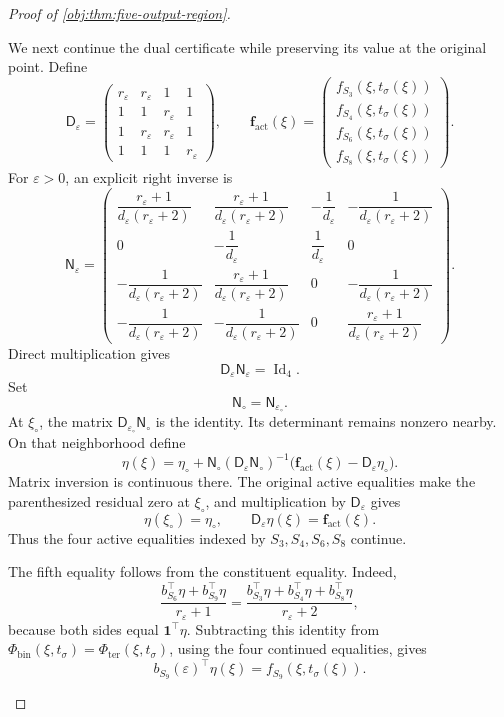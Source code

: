 \begin{proof}[Proof of \cref{obj:thm:five-output-region}]
\begin{enumerate}
We next continue the dual certificate while preserving its value at the
original point. Define
\[
\mathsf D_\varepsilon=
\begin{pmatrix}
r_\varepsilon&r_\varepsilon&1&1\\
1&1&r_\varepsilon&1\\
1&r_\varepsilon&r_\varepsilon&1\\
1&1&1&r_\varepsilon
\end{pmatrix},
\qquad
\boldsymbol f_{\mathrm{act}}(\xi)=
\begin{pmatrix}
f_{S_3}(\xi,t_\sigma(\xi))\\
f_{S_4}(\xi,t_\sigma(\xi))\\
f_{S_6}(\xi,t_\sigma(\xi))\\
f_{S_8}(\xi,t_\sigma(\xi))
\end{pmatrix}.
\]
For \(\varepsilon>0\), an explicit right inverse is
\[
\mathsf N_\varepsilon=
\begin{pmatrix}
\dfrac{r_\varepsilon+1}{d_\varepsilon(r_\varepsilon+2)}
&\dfrac{r_\varepsilon+1}{d_\varepsilon(r_\varepsilon+2)}
&-\dfrac1{d_\varepsilon}
&-\dfrac1{d_\varepsilon(r_\varepsilon+2)}\\
0&-\dfrac1{d_\varepsilon}&\dfrac1{d_\varepsilon}&0\\
-\dfrac1{d_\varepsilon(r_\varepsilon+2)}
&\dfrac{r_\varepsilon+1}{d_\varepsilon(r_\varepsilon+2)}
&0&-\dfrac1{d_\varepsilon(r_\varepsilon+2)}\\
-\dfrac1{d_\varepsilon(r_\varepsilon+2)}
&-\dfrac1{d_\varepsilon(r_\varepsilon+2)}
&0&\dfrac{r_\varepsilon+1}{d_\varepsilon(r_\varepsilon+2)}
\end{pmatrix}.
\]
Direct multiplication gives
\[
\mathsf D_\varepsilon\mathsf N_\varepsilon=\operatorname{Id}_4.
\]
Set
\[
\mathsf N_\circ=\mathsf N_{\varepsilon_\circ}.
\]
At \(\xi_\circ\), the matrix
\(\mathsf D_{\varepsilon_\circ}\mathsf N_\circ\) is the identity.
Its determinant remains nonzero nearby. On that neighborhood define
\[
\eta(\xi)
=
\eta_\circ+
\mathsf N_\circ
(\mathsf D_\varepsilon\mathsf N_\circ)^{-1}
\bigl(\boldsymbol f_{\mathrm{act}}(\xi)
      -\mathsf D_\varepsilon\eta_\circ\bigr).
\]
Matrix inversion is continuous there. The original active equalities
make the parenthesized residual zero at \(\xi_\circ\), and multiplication
by \(\mathsf D_\varepsilon\) gives
\[
\eta(\xi_\circ)=\eta_\circ,
\qquad
\mathsf D_\varepsilon\eta(\xi)=\boldsymbol f_{\mathrm{act}}(\xi).
\]
Thus the four active equalities indexed by \(S_3,S_4,S_6,S_8\) continue.

The fifth equality follows from the constituent equality. Indeed,
\[
\frac{b_{S_6}^\top\eta+b_{S_9}^\top\eta}{r_\varepsilon+1}
=
\frac{b_{S_3}^\top\eta+b_{S_4}^\top\eta+b_{S_8}^\top\eta}
     {r_\varepsilon+2},
\]
because both sides equal \(\mathbf1^\top\eta\).
Subtracting this identity from
\(\Phi_{\mathrm{bin}}(\xi,t_\sigma)=
\Phi_{\mathrm{ter}}(\xi,t_\sigma)\), using the four continued
equalities, gives
\[
b_{S_9}(\varepsilon)^\top\eta(\xi)
=
f_{S_9}(\xi,t_\sigma(\xi)).
\]


\end{enumerate}
\end{proof}

